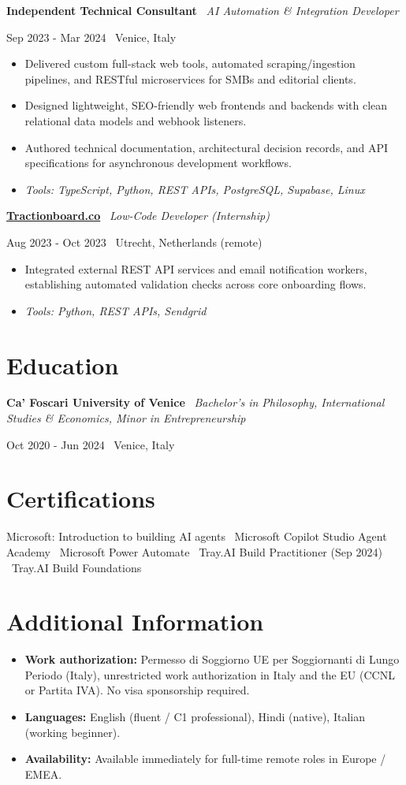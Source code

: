 \documentclass[a4paper,10pt]{article}
\newcommand{\role}[4]{%
  \vspace{2pt}\noindent
  \begin{minipage}[t]{0.70\textwidth}\raggedright\textbf{#1} \textbullet\ \textit{#3}\end{minipage}%
  \hfill
  \begin{minipage}[t]{0.28\textwidth}\raggedleft\footnotesize\color{gray}#2 \textbullet\ #4\end{minipage}%
  \vspace{1pt}%
}
\begin{document}
\role{Independent Technical Consultant}{Sep 2023 - Mar 2024}{AI Automation \& Integration Developer}{Venice, Italy}
\begin{itemize}
  \item Delivered custom full-stack web tools, automated scraping/ingestion pipelines, and RESTful microservices for SMBs and editorial clients.
  \item Designed lightweight, SEO-friendly web frontends and backends with clean relational data models and webhook listeners.
  \item Authored technical documentation, architectural decision records, and API specifications for asynchronous development workflows.
  \item \textit{Tools: TypeScript, Python, REST APIs, PostgreSQL, Supabase, Linux}
\end{itemize}

\role{\href{https://tractionboard.co}{Tractionboard.co}}{Aug 2023 - Oct 2023}{Low-Code Developer (Internship)}{Utrecht, Netherlands (remote)}
\begin{itemize}
  \item Integrated external REST API services and email notification workers, establishing automated validation checks across core onboarding flows.
  \item \textit{Tools: Python, REST APIs, Sendgrid}
\end{itemize}

\section{Education}
\role{Ca' Foscari University of Venice}{Oct 2020 - Jun 2024}{Bachelor's in Philosophy, International Studies \& Economics, Minor in Entrepreneurship}{Venice, Italy}

\section{Certifications}
Microsoft: Introduction to building AI agents \textbullet\ Microsoft Copilot Studio Agent Academy \textbullet\ Microsoft Power Automate \textbullet\ Tray.AI Build Practitioner (Sep 2024) \textbullet\ Tray.AI Build Foundations

\section{Additional Information}
\begin{itemize}
  \item \textbf{Work authorization:} Permesso di Soggiorno UE per Soggiornanti di Lungo Periodo (Italy), unrestricted work authorization in Italy and the EU (CCNL or Partita IVA). No visa sponsorship required.
  \item \textbf{Languages:} English (fluent / C1 professional), Hindi (native), Italian (working beginner).
  \item \textbf{Availability:} Available immediately for full-time remote roles in Europe / EMEA.
\end{itemize}
\end{document}
